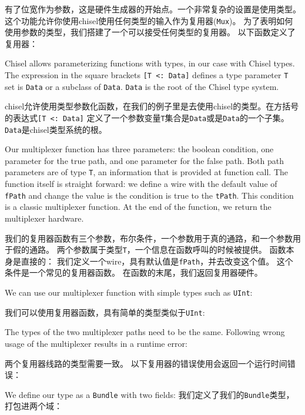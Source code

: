 \documentclass[%
    10pt,
    headinclude, footexclude,
    openright, %
    notitlepage,
    cleardoubleempty,
    headsepline,
    pointlessnumbers,
    bibtotoc, idxtotoc,
    ]{scrbook}
\newcommand{\code}[1]{{\small{\texttt{#1}}}}
\begin{document}
有了位宽作为参数，这是硬件生成器的开始点。一个非常复杂的设置是使用类型。
这个功能允许你使用chisel使用任何类型的输入作为复用器(\code{Mux})。
为了表明如何使用参数的类型，我们搭建了一个可以接受任何类型的复用器。
以下函数定义了复用器：


Chisel allows parameterizing functions with types, in our case with Chisel
types. The expression in the square brackets \code{[T <: Data]} defines
a type parameter \code{T} set is \code{Data} or a subclass of \code{Data}.
\code{Data} is the root of the Chisel type system.

chisel允许使用类型参数化函数，在我们的例子里是去使用chisel的类型。在方括号的表达式\code{[T <: Data]}
定义了一个参数变量\code{T}集合是\code{Data}或是\code{Data}的一个子集。
\code{Data}是chisel类型系统的根。

Our multiplexer function has three parameters: the boolean condition,
one parameter for the true path, and one parameter for the false path.
Both path parameters are of type \code{T}, an information that is
provided at function call. The function itself is straight forward:
we define a wire with the default value of \code{fPath} and
change the value is the condition is true to the \code{tPath}.
This condition is a classic multiplexer function.
At the end of the function, we return the multiplexer hardware.

我们的复用器函数有三个参数，布尔条件，一个参数用于真的通路，和一个参数用于假的通路。
两个参数属于类型\code{T}，一个信息在函数呼叫的时候被提供。
函数本身是直接的：
我们定义一个wire，具有默认值是\code{fPath}，并去改变这个值。
这个条件是一个常见的复用器函数。
在函数的末尾，我们返回复用器硬件。

We can use our multiplexer function with simple types such as
\code{UInt}:

我们可以使用复用器函数，具有简单的类型类似于\code{UInt}:


\noindent The types of the two multiplexer paths need to be the same.
Following wrong usage of the multiplexer results in a runtime error:

\noindent 两个复用器线路的类型需要一致。
以下复用器的错误使用会返回一个运行时间错误：


\noindent We define our type as a \code{Bundle} with two fields:
\noindent 我们定义了我们的\code{Bundle}类型，打包进两个域：
\end{document}
